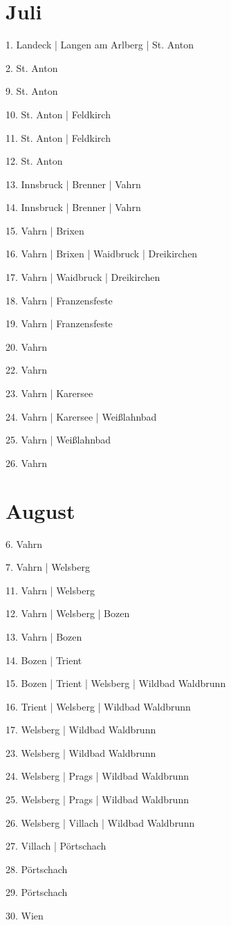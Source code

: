 \documentclass[twoside=false,titlepage=false,open=any, parskip=never, fontsize=10pt, headings=small, chapterprefix=false, appendixprefix=false, DIV=15]{scrbook}
\begin{document}
\begin{multicols}{3}
            \section*{Juli}
            1. Landeck | Langen am Arlberg | St. Anton\par
            2. St. Anton\par
            9. St. Anton\par
            10. St. Anton | Feldkirch\par
            11. St. Anton | Feldkirch\par
            12. St. Anton\par
            13. Innsbruck | Brenner | Vahrn\par
            14. Innsbruck | Brenner | Vahrn\par
            15. Vahrn | Brixen\par
            16. Vahrn | Brixen | Waidbruck | Dreikirchen\par
            17. Vahrn | Waidbruck | Dreikirchen\par
            18. Vahrn | Franzensfeste\par
            19. Vahrn | Franzensfeste\par
            20. Vahrn\par
            22. Vahrn\par
            23. Vahrn | Karersee\par
            24. Vahrn | Karersee | Weißlahnbad\par
            25. Vahrn | Weißlahnbad\par
            26. Vahrn\par
            \section*{August}
            6. Vahrn\par
            7. Vahrn | Welsberg\par
            11. Vahrn | Welsberg\par
            12. Vahrn | Welsberg | Bozen\par
            13. Vahrn | Bozen\par
            14. Bozen | Trient\par
            15. Bozen | Trient | Welsberg | Wildbad Waldbrunn\par
            16. Trient | Welsberg | Wildbad Waldbrunn\par
            17. Welsberg | Wildbad Waldbrunn\par
            23. Welsberg | Wildbad Waldbrunn\par
            24. Welsberg | Prags | Wildbad Waldbrunn\par
            25. Welsberg | Prags | Wildbad Waldbrunn\par
            26. Welsberg | Villach | Wildbad Waldbrunn\par
            27. Villach | Pörtschach\par
            28. Pörtschach\par
            29. Pörtschach\par
            30. Wien\par

\end{multicols}
\end{document}

